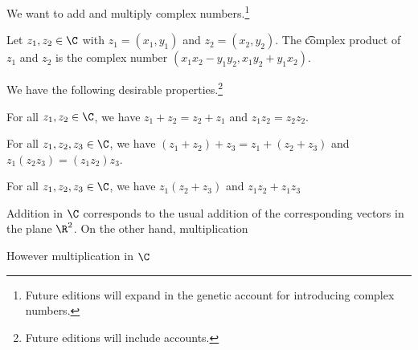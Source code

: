

We want to add and multiply complex numbers.\footnote{Future editions will expand in the genetic account for introducing complex numbers.}


Let $z_1, z_2 \in \C$ with $z_1 = (x_1, y_1)$ and $z_2 = (x_2, y_2)$.
The \t{complex product} of $z_1$ and $z_2$ is the complex number $(x_1x_2 - y_1y_2, x_1y_2 + y_1x_2)$.




We have the following desirable properties.\footnote{Future editions will include accounts.}

\begin{proposition}[Commutativity]
For all $z_1, z_2 \in \C$, we have
	$z_1 + z_2 = z_2 + z_1$ and $z_1z_2 = z_2z_2$.
\end{proposition}

\begin{proposition}[Associativity]
For all $z_1, z_2, z_3 \in \C$, we have
	$(z_1 + z_2) +z_3= z_1 + (z_2 + z_3)$ and $z_1(z_2z_3) = (z_1z_2)z_3$.
\end{proposition}

\begin{proposition}[Distributivity]
For all $z_1, z_2, z_3 \in \C$, we have
	$z_1(z_2 + z_3)$ and $z_1z_2 + z_1z_3$
\end{proposition}


Addition in $\C$ corresponds to the usual addition of the corresponding vectors in the plane $\R^2$.
On the other hand, multiplication

However multiplication in $\C$

